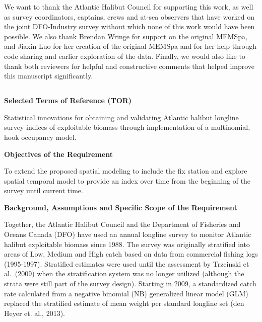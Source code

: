 \documentclass[12pt]{article}\usepackage[]{graphicx}\usepackage[]{color}
\begin{document}
We want to thank the Atlantic Halibut Council for supporting this work, as well as survey coordinators, captains, crews and at-sea observers that have worked on the joint DFO-Industry survey without which none of this work would have been possible. We also thank Brendan Wringe for support on the original MEMSpa, and Jiaxin Luo for her creation of the original MEMSpa and for her help through code sharing and earlier exploration of the data. Finally, we would also like to thank both reviewers for helpful and constructive comments that helped improve this manuscript significantly.

\begin{appendices}

\clearpage

\section{}
\label{app:first-appendix}


\centering

\textbf{Selected Terms of Reference (TOR)} \flushleft

Statistical innovations for obtaining and validating Atlantic halibut longline survey indices of exploitable biomass through implementation of a multinomial, hook occupancy model.

\textbf{Objectives of the Requirement}

To extend the proposed spatial modeling to include the fix station and explore spatial temporal model to provide an index over time from the beginning of the survey until current time.

\textbf{Background, Assumptions and Specific Scope of the Requirement}

Together, the Atlantic Halibut Council and the Department of Fisheries and Oceans Canada (DFO) have used an annual longline survey to monitor Atlantic halibut exploitable biomass since 1988. The survey was originally stratified into areas of Low, Medium and High catch based on data from commercial fishing logs (1995-1997). Stratified estimates were used until the assessment by Trzcinski et al.~(2009) when the stratification system was no longer utilized (although the strata were still part of the survey design). Starting in 2009, a standardized catch rate calculated from a negative binomial (NB) generalized linear model (GLM) replaced the stratified estimate of mean weight per standard longline set (den Heyer et. al., 2013).


\end{appendices}
\end{document}
